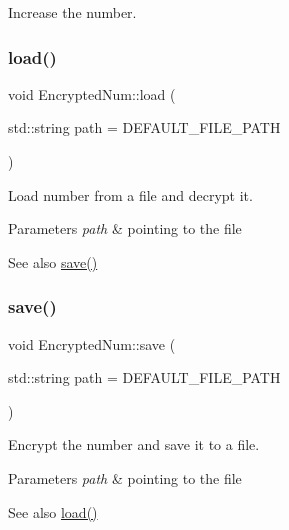 Increase the number. 

\mbox{\label{class_encrypted_num_adb5f15f13ecd4fd79511164c42448433}} 
\subsubsection{\texorpdfstring{load()}{load()}}
{\footnotesize\ttfamily void Encrypted\+Num\+::load (\begin{DoxyParamCaption}\item[{std\+::string}]{path = {\ttfamily DEFAULT\+\_\+FILE\+\_\+PATH} }\end{DoxyParamCaption})\hspace{0.3cm}{\ttfamily [virtual]}}



Load number from a file and decrypt it. 


\begin{DoxyParams}{Parameters}
{\em path} & pointing to the file \\
\hline
\end{DoxyParams}
\begin{DoxySeeAlso}{See also}
\mbox{\hyperlink{class_encrypted_num_a33cddaaa96d51dbe29f0f99278c287dc}{save()}} 
\end{DoxySeeAlso}
\mbox{\label{class_encrypted_num_a33cddaaa96d51dbe29f0f99278c287dc}} 
\subsubsection{\texorpdfstring{save()}{save()}}
{\footnotesize\ttfamily void Encrypted\+Num\+::save (\begin{DoxyParamCaption}\item[{std\+::string}]{path = {\ttfamily DEFAULT\+\_\+FILE\+\_\+PATH} }\end{DoxyParamCaption})\hspace{0.3cm}{\ttfamily [virtual]}}



Encrypt the number and save it to a file. 


\begin{DoxyParams}{Parameters}
{\em path} & pointing to the file \\
\hline
\end{DoxyParams}
\begin{DoxySeeAlso}{See also}
\mbox{\hyperlink{class_encrypted_num_adb5f15f13ecd4fd79511164c42448433}{load()}} 
\end{DoxySeeAlso}
\mbox{\label{class_encrypted_num_a4469ba057a691e6edacc25022596d1fa}} 
